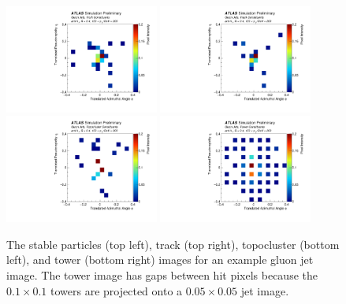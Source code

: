 \begin{figure}[htpb]
\begin{center}
\includegraphics[width=0.45\textwidth]{figures/CNN/gluon_truth_one.pdf}
\includegraphics[width=0.45\textwidth]{figures/CNN/gluon_track_one.pdf}\\
\includegraphics[width=0.45\textwidth]{figures/CNN/gluon_cluster_one.pdf}
\includegraphics[width=0.45\textwidth]{figures/CNN/gluon_tower_one.pdf}
\caption{The stable particles (top left), track (top right), topocluster (bottom left), and tower (bottom right) images 
for an example gluon jet image.  
The tower image has gaps between hit pixels because the $0.1\times 0.1$ towers are projected onto a $0.05\times 0.05$ jet image.}
\label{fig:cnn-oneimage}
\end{center}
\end{figure}

